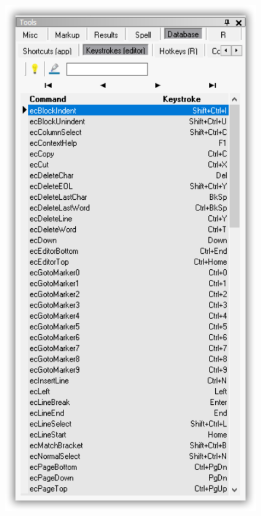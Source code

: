 \begin{figure}[H]
  \includegraphics[scale=0.35]{./res/tools_database_keystrokes.png}~~

\end{figure}
